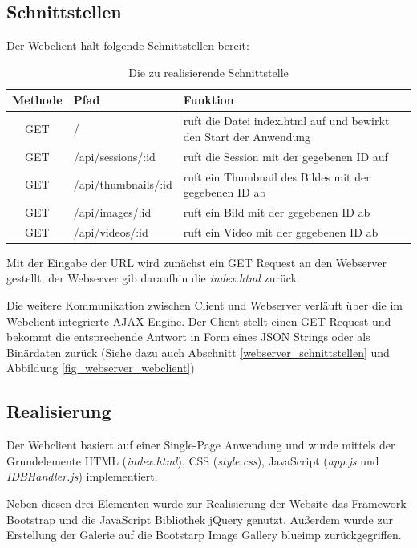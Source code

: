 \subsection{Schnittstellen}
Der Webclient hält folgende Schnittstellen bereit:

\begin{table}[h]
	\begin{center}
		\begin{tabularx}{\textwidth}{|c|l|X|}
			\hline
			\textbf{Methode} & \textbf{Pfad} & \textbf{Funktion}\\
			\hline
			GET & / & ruft die Datei index.html auf und bewirkt den Start der Anwendung \\
			\hline
			GET & /api/sessions/:id & ruft die Session mit der gegebenen ID auf \\
			\hline
			GET & /api/thumbnails/:id & ruft ein Thumbnail des Bildes mit der gegebenen ID ab \\
			\hline
			GET & /api/images/:id & ruft ein Bild mit der gegebenen ID ab \\
			\hline
			GET & /api/videos/:id & ruft ein Video mit der gegebenen ID ab \\
			\hline
		\end{tabularx}
		\caption{Die zu realisierende Schnittstelle}
		\label{tab_api_routes}
	\end{center}
\end{table}

Mit der Eingabe der URL wird zunächst ein GET Request an den Webserver gestellt, der Webserver gib daraufhin die \textit{index.html} zurück.

Die weitere Kommunikation zwischen Client und Webserver verläuft über die im Webclient integrierte AJAX-Engine. Der Client stellt einen GET Request und bekommt die entsprechende Antwort in Form eines JSON Strings oder als Binärdaten zurück (Siehe dazu auch Abschnitt \ref{webserver_schnittstellen} und Abbildung \ref{fig_webserver_webclient})

\subsection{Realisierung}
Der Webclient basiert auf einer Single-Page Anwendung und wurde mittels der Grundelemente HTML (\textit{index.html}), CSS (\textit{style.css}), JavaScript (\textit{app.js} und \textit{IDBHandler.js}) implementiert. 

Neben diesen drei Elementen wurde zur Realisierung der Website das Framework Bootstrap und die JavaScript Bibliothek jQuery genutzt. Außerdem wurde zur Erstellung der Galerie auf die Bootstarp Image Gallery blueimp  zurückgegriffen.

